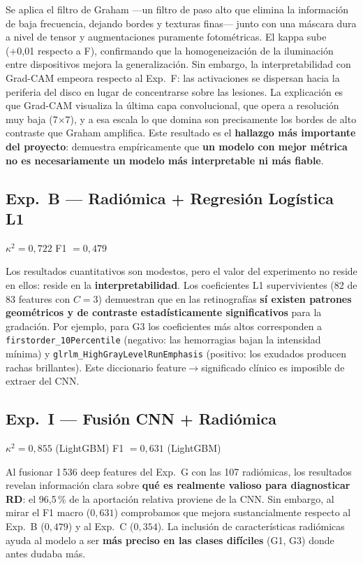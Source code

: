 \documentclass[12pt, a4paper]{article}
\begin{document}
Se aplica el filtro de Graham ---un filtro de paso alto que elimina la
información de baja frecuencia, dejando bordes y texturas finas--- junto
con una máscara dura a nivel de tensor y augmentaciones puramente
fotométricas. El kappa sube (+0,01 respecto a F), confirmando que la
homogeneización de la iluminación entre dispositivos mejora la
generalización. Sin embargo, la interpretabilidad con Grad-CAM empeora
respecto al Exp.~F: las activaciones se dispersan hacia la periferia del
disco en lugar de concentrarse sobre las lesiones. La explicación es que
Grad-CAM visualiza la última capa convolucional, que opera a resolución
muy baja (7$\times$7), y a esa escala lo que domina son precisamente los
bordes de alto contraste que Graham amplifica. Este resultado es el
\textbf{hallazgo más importante del proyecto}: demuestra empíricamente
que \textbf{un modelo con mejor métrica no es necesariamente un modelo
más interpretable ni más fiable}.

\subsection{Exp.~B --- Radiómica + Regresión Logística L1}

$\kappa^2 = 0{,}722$ \quad F1 $= 0{,}479$

Los resultados cuantitativos son modestos, pero el valor del experimento
no reside en ellos: reside en la \textbf{interpretabilidad}. Los
coeficientes L1 supervivientes (82 de 83 features con $C=3$) demuestran
que en las retinografías \textbf{sí existen patrones geométricos y de
contraste estadísticamente significativos} para la gradación. Por ejemplo,
para G3 los coeficientes más altos corresponden a
\texttt{firstorder\_10Percentile} (negativo: las hemorragias bajan la
intensidad mínima) y \texttt{glrlm\_HighGrayLevelRunEmphasis} (positivo:
los exudados producen rachas brillantes). Este diccionario
feature$\to$significado clínico es imposible de extraer del CNN.

\subsection{Exp.~I --- Fusión CNN + Radiómica}

$\kappa^2 = 0{,}855$ (LightGBM) \quad F1 $= 0{,}631$ (LightGBM)

Al fusionar 1\,536 deep features del Exp.~G con las 107 radiómicas, los
resultados revelan información clara sobre \textbf{qué es realmente
valioso para diagnosticar RD}: el 96,5\,\% de la aportación relativa
proviene de la CNN. Sin embargo, al mirar el F1 macro ($0{,}631$)
comprobamos que mejora sustancialmente respecto al Exp.~B ($0{,}479$) y
al Exp.~C ($0{,}354$). La inclusión de características radiómicas ayuda
al modelo a ser \textbf{más preciso en las clases difíciles} (G1, G3)
donde antes dudaba más.
\end{document}
